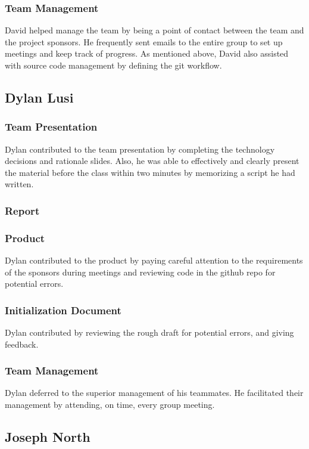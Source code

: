 \documentclass[12pt]{article}
\begin{document}
\begin{spacing}{1.5}
\subsubsection{Team Management}
David helped manage the team by being a point of contact between the team and the project sponsors. He frequently sent emails to the entire group to set up meetings and keep track of progress. As mentioned above, David also assisted with source code management by defining the git workflow.

\clearpage

\subsection{Dylan Lusi}
\subsubsection{Team Presentation}
Dylan contributed to the team presentation by completing the technology decisions and rationale slides.  Also, he was able to effectively and clearly present the material before the class within two minutes by memorizing a script he had written.
\subsubsection{Report}
\subsubsection{Product}
Dylan contributed to the product by paying careful attention to the requirements of the sponsors during meetings and reviewing code in the github repo for potential errors.
\subsubsection{Initialization Document}
Dylan contributed by reviewing the rough draft for potential errors, and giving feedback. 
\subsubsection{Team Management}
Dylan deferred to the superior management of his teammates.  He facilitated their management by attending, on time, every group meeting.

\clearpage

\subsection{Joseph North}

\end{spacing}
\end{document}
